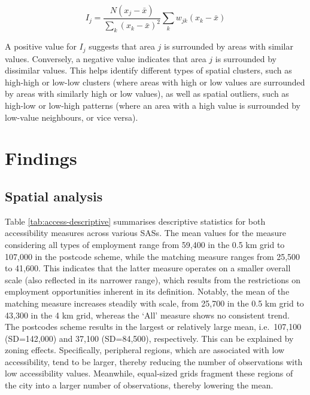 \documentclass{article}
\begin{document}
\begin{equation}
  I_j = \frac{N (x_j - \bar{x})}{\sum_{k} (x_k - \bar{x})^2} \sum_{k} w_{jk} (x_k - \bar{x})
\label{eq:lisa-statistic}
\end{equation}

A positive value for \(I_j\) suggests that area \(j\) is surrounded by
areas with similar values. Conversely, a negative value indicates that
area \(j\) is surrounded by dissimilar values. This helps identify
different types of spatial clusters, such as high-high or low-low
clusters (where areas with high or low values are surrounded by areas
with similarly high or low values), as well as spatial outliers, such as
high-low or low-high patterns (where an area with a high value is
surrounded by low-value neighbours, or vice versa).

\section{\texorpdfstring{Findings
\label{sec:findings}}{Findings }}\label{findings}

\subsection{Spatial analysis}\label{spatial-analysis}

Table \ref{tab:access-descriptive} summarises descriptive statistics for
both accessibility measures across various SASs. The mean values for the
measure considering all types of employment range from 59,400 in the 0.5
km grid to 107,000 in the postcode scheme, while the matching measure
ranges from 25,500 to 41,600. This indicates that the latter measure
operates on a smaller overall scale (also reflected in its narrower
range), which results from the restrictions on employment opportunities
inherent in its definition. Notably, the mean of the matching measure
increases steadily with scale, from 25,700 in the 0.5 km grid to 43,300
in the 4 km grid, whereas the `All' measure shows no consistent trend.
The postcodes scheme results in the largest or relatively large mean,
i.e.~107,100 (SD=142,000) and 37,100 (SD=84,500), respectively. This can
be explained by zoning effects. Specifically, peripheral regions, which
are associated with low accessibility, tend to be larger, thereby
reducing the number of observations with low accessibility values.
Meanwhile, equal-sized grids fragment these regions of the city into a
larger number of observations, thereby lowering the mean.
\end{document}
